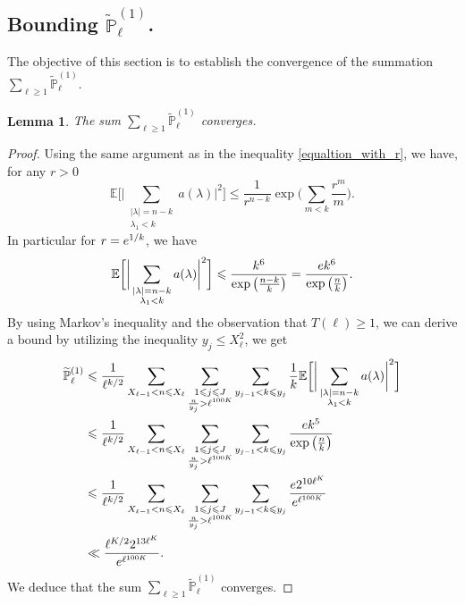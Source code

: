 \documentclass{article}
\newtheorem{lemma}[theorem]{Lemma}
\begin{document}
\subsection{Bounding $\widetilde{\mathbb{P}}^{(1)}_{\ell} $.}
The objective of this section is to establish the convergence of the summation $\sum_{\ell \geqslant 1} \widetilde{\mathbb{P}}^{(1)}_{\ell}$.
\begin{lemma}\label{Ptilde_conv_tilde}
    The sum  $\sum_{\ell \geqslant 1} \widetilde{\mathbb{P}}^{(1)}_{\ell} $ converges.
\end{lemma}
\begin{proof}[Proof]
    Using the same argument as in the inequality \eqref{equaltion_with_r}, we have, for any $r>0$
    $$
    \mathbb{E}\bigg[ \bigg| \sum_{\substack{|\lambda|=n-k \\ \lambda_1 <  k }} a(\lambda) \bigg|^2 \bigg] \leqslant \frac{1}{r^{n-k}} \exp\bigg(\sum_{m <k} \frac{r^m}{m} \bigg).
    $$
    In particular for $r={\rm e}^{1/k}$, we have
    $$
    \mathbb{E}\bigg[ \bigg| \sum_{\substack{|\lambda|=n-k \\ \lambda_1 <  k }} a(\lambda) \bigg|^2 \bigg] \leqslant \frac{k^6}{\exp\big(\frac{n-k}{k}\big)} =\frac{{\rm e}k^6}{\exp\big(\frac{n}{k}\big)} .
    $$
    By using Markov's inequality and the observation that $T(\ell) \geqslant 1$, we can derive a bound by utilizing the inequality $y_j\leqslant X_{\ell}^2$, we get
    $$
    \begin{aligned}
        \widetilde{\mathbb{P}}^{(1)}_{\ell} &\leqslant \frac{1}{\ell^{k/2}}  \sum_{X_{\ell-1}<n\leqslant X_{\ell}}\sum_{\substack{ 1 \leqslant j\leqslant J \\ \frac{n}{y_{j}} >\ell^{100K}}}\sum_{ y_{j-1} <k \leqslant y_j}  \frac{1}{k}\mathbb{E}\bigg[ \bigg| \sum_{\substack{|\lambda|=n-k \\ \lambda_1 <  k }} a(\lambda) \bigg|^2 \bigg]
        \\ & \leqslant \frac{1}{\ell^{k/2}}  \sum_{X_{\ell-1}<n\leqslant X_{\ell}}\sum_{\substack{ 1 \leqslant j\leqslant J \\ \frac{n}{y_{j}} >\ell^{100K}}}\sum_{ y_{j-1} <k \leqslant y_j} \frac{{\rm e}k^5}{\exp\big(\frac{n}{k}\big)}
        \\ & \leqslant \frac{1}{\ell^{k/2}}  \sum_{X_{\ell-1}<n\leqslant X_{\ell}}\sum_{\substack{ 1 \leqslant j\leqslant J \\ \frac{n}{y_{j}} >\ell^{100K}}}\sum_{ y_{j-1} <k \leqslant y_j} \frac{{\rm e}2^{10\ell^{K}}}{{\rm e}^{\ell^{100K}}}
        \\ & \ll \frac{\ell^{K/2} 2^{13\ell^K}}{{\rm e}^{\ell^{100K}}}.
    \end{aligned}
    $$
    We deduce that the sum  $\sum_{\ell \geqslant 1} \widetilde{\mathbb{P}}^{(1)}_{\ell} $ converges.
\end{proof}
\end{document}
